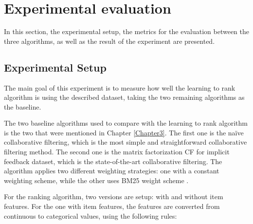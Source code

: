 \chapter{Experimental evaluation} %

\label{Chapter5} %

In this section, the experimental setup, the metrics for the evaluation between the three algorithms, as well as the result of the experiment are presented.

\section{Experimental Setup}
The main goal of this experiment is to measure how well the learning to rank algorithm is using the described dataset, taking the two remaining algorithms as the baseline. 

\noindent The two baseline algorithms used to compare with the learning to rank algorithm is the two that were mentioned in Chapter \ref{Chapter3}. The first one is the na\"ive collaborative filtering, which is the most simple and straightforward collaborative filtering method. The second one is the matrix factorization CF for implicit feedback dataset, which is the state-of-the-art collaborative filtering. The algorithm applies two different weighting strategies: one with a constant weighting scheme, while the other uses BM25 weight scheme \cite{singhal2001modern}.

\noindent For the ranking algorithm, two versions are setup: with and without item features. For the one with item features, the features are converted from continuous to categorical values, using the following rules:


